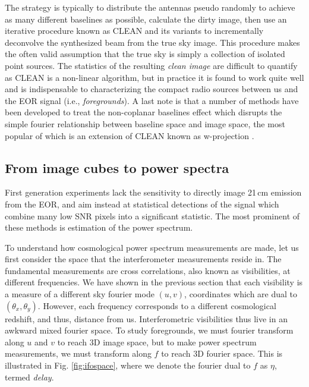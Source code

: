 The strategy is typically to distribute the antennas pseudo randomly to achieve as many different baselines as possible, calculate the dirty image, then use an iterative procedure known as CLEAN \citep{hogbomclean} and its variants to incrementally deconvolve the synthesized beam from the true sky image. This procedure makes the often valid assumption that the true sky is simply a collection of isolated point sources. The statistics of the resulting \textit{clean image} are difficult to quantify as CLEAN is a non-linear algorithm, but in practice it is found to work quite well and is indispensable to characterizing the compact radio sources between us and the EOR signal (i.e., \textit{foregrounds}). A last note is that a number of methods have been developed to treat the non-coplanar baselines effect which disrupts the simple fourier relationship between baseline space and image space, the most popular of which is an extension of CLEAN known as w-projection \citep{wproj}.


\subsection{From image cubes to power spectra}

First generation experiments lack the sensitivity to directly image 21\,cm emission from the EOR, and aim instead at statistical detections of the signal which combine many low SNR pixels into a significant statistic. The most prominent of these methods is estimation of the power spectrum.

To understand how cosmological power spectrum measurements are made, let us first consider the space that the interferometer measurements reside in. The fundamental measurements are cross correlations, also known as visibilities, at different frequencies. We have shown in the previous section that each visibility is a measure of a different sky fourier mode $(u,v)$, coordinates which are dual to $(\theta_x,\theta_y)$. However, each frequency corresponds to a different cosmological redshift, and thus, distance from us. Interferometric visibilities thus live in an awkward mixed fourier space. To study foregrounds, we must fourier transform along $u$ and $v$ to reach 3D image space, but to make power spectrum measurements, we must transform along $f$ to reach 3D fourier space. This is illustrated in Fig. \ref{fig:ifospace}, where we denote the fourier dual to $f$ as $\eta$, termed \textit{delay}.

